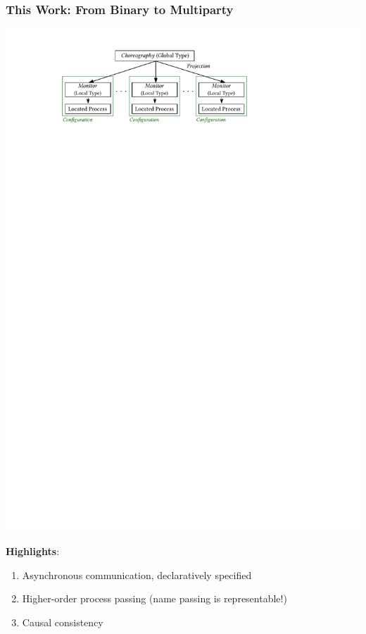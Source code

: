 \documentclass[12pt]{beamer}
\begin{document}
\begin{frame}
\frametitle{This Work: From Binary to Multiparty}
\begin{center}
\includegraphics[scale=1.05]{figmodel}
\end{center}

\textbf{Highlights}:
\begin{enumerate}[$\bullet$]
	\item Asynchronous communication, declaratively specified
	\item Higher-order process passing (name passing is representable!)
	\item Causal consistency 
	\end{enumerate}
\end{frame}

\end{document}
